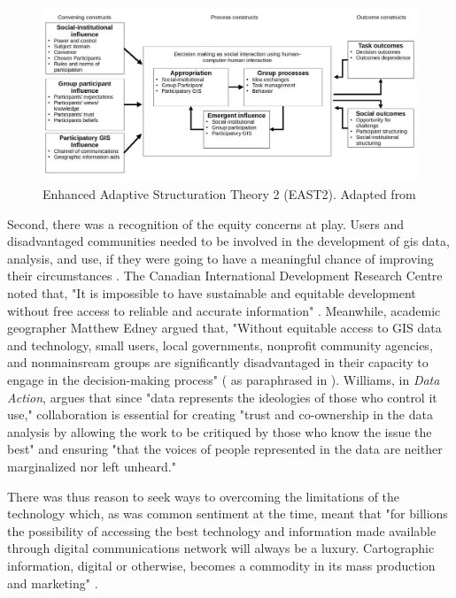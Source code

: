 \begin{figure}[!htb]
	\centering
	\includegraphics[scale=0.4]{Figures/chap2/east2.jpg}
	\caption[Enhanced Adaptive Structuration Theory 2]{Enhanced Adaptive Structuration Theory 2 (EAST2). Adapted from \cite{jankowskiGISGroupDecision2001}}
	\label{fig:east2}
\end{figure}

Second, there was a recognition of the equity concerns at play. Users and disadvantaged communities needed to be involved in the development of \ac{gis} data, analysis, and use, if they were going to have a meaningful chance of improving their circumstances \cite{talenBottomUpGIS2000}. The Canadian International Development Research Centre noted that, "It is impossible to have sustainable and equitable development without free access to reliable and accurate information" \cite{benmouffokInformationDecisionMaking1993}. Meanwhile, academic geographer Matthew Edney argued that, "Without equitable access to GIS data and technology, small users, local governments, nonprofit community agencies, and nonmainsream groups are significantly disadvantaged in their capacity to engage in the decision-making process" (\cite{edney1991strategies} as paraphrased in \cite{harrisPursuingSocialGoals1994}). Williams, in \textit{Data Action}, argues that since "data represents the ideologies of those who control it use," collaboration is essential for creating "trust and co-ownership in the data analysis by allowing the work to be critiqued by those who know the issue the best" and ensuring "that the voices of people represented in the data are neither marginalized nor left unheard."

There was thus reason to seek ways to overcoming the limitations of the technology which, as was common sentiment at the time, meant that "for billions the possibility of accessing the best technology and information made available through digital communications network will always be a luxury. Cartographic information, digital or otherwise, becomes a commodity in its mass production and marketing" \cite{mchaffieManufacturingMetaphors1994}. 

